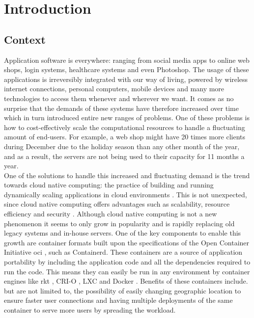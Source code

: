 \chapter{Introduction}                                 \label{ch:introduction}
\section{Context}  \label{sec:context}
Application software is everywhere: ranging from social media apps to online web shops, login systems, healthcare systems and even Photoshop. The usage of these applications is irreversibly integrated with our way of living, powered by wireless internet connections, personal computers, mobile devices and many more technologies to access them whenever and wherever we want. It comes as no surprise that the demands of these systems have therefore increased over time which in turn introduced entire new ranges of problems. One of these problems is how to cost-effectively scale the computational resources to handle a fluctuating amount of end-users. For example, a web shop might have 20 times more clients during December due to the holiday season than any other month of the year, and as a result, the servers are not being used to their capacity for 11 months a year.
\\[10pt]

 One of the solutions to handle this increased and fluctuating demand is the trend towards cloud native computing: the practice of building and running dynamically scaling applications in cloud environments \cite{CNCF}. This is not unexpected, since cloud native computing offers advantages such as scalability, resource efficiency and security \cite{cnci4}. Although cloud native computing is not a new phenomenon it seems to only grow in popularity \cite{CNCFSurvey} and is rapidly replacing old legacy systems and in-house servers. One of the key components to enable this growth are container formats built upon the specifications of the Open Container Initiative \acrshort{oci} \cite{OCI}, such as Containerd. These containers are a source of application portability by including the application code and all the dependencies required to run the code. This means they can easily be run in any environment by container engines like rkt \cite{rkt}, CRI-O \cite{crio}, LXC \cite{LXC} and Docker \cite{Bernstein2014}. Benefits of these containers include. but are not limited to, the possibility of easily changing geographic location to ensure faster user connections and having multiple deployments of the same container to serve more users by spreading the workload. 
\\[10pt]

